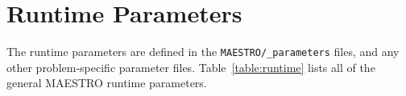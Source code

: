 
\section{Runtime Parameters}

The runtime parameters are defined in the {\tt MAESTRO/\_parameters}
files, and any other problem-specific parameter files.
Table~\ref{table:runtime} lists all of the general MAESTRO runtime 
parameters.
